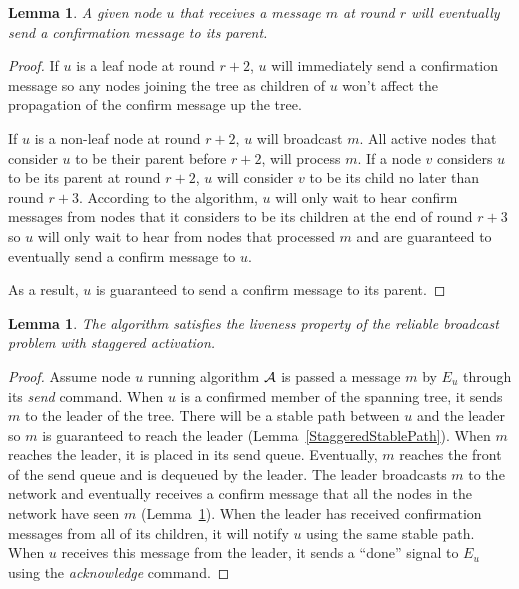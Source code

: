\documentclass[english]{article}
\newtheorem{lemma}[theorem]{Lemma}
\begin{document}
\begin{lemma}
\label{StaggeredSpanningTreePropagation}
A given node $u$ that receives a message $m$ at round $r$ will eventually send a confirmation message to its parent. 
\end{lemma}
\begin{proof}

 If $u$ is a leaf node at round $r+2$, $u$ will immediately send a confirmation message so any nodes joining the tree as children of $u$ won't affect the propagation of the confirm message up the tree. 

If $u$ is a non-leaf node at round $r+2$, $u$ will broadcast $m$. All active nodes that consider $u$ to be their parent before $r+2$, will process $m$. If a node $v$ considers $u$ to be its parent at round $r+2$, $u$ will consider $v$ to be its child no later than round $r+3$. According to the algorithm, $u$ will only wait to hear confirm messages from nodes that it considers to be its children at the end of round $r+3$ so $u$ will only wait to hear from nodes that processed $m$ and are guaranteed to eventually send a confirm message to $u$. 

As a result, $u$ is guaranteed to send a confirm message to its parent. 

\end{proof}

\begin{lemma}
\label{StaggeredRBLiveness}
The algorithm satisfies the liveness property of the reliable broadcast problem with staggered activation.
\end{lemma}
\begin{proof}

Assume node $u$ running algorithm $\cal A$ is passed a message $m$ by $E_u$ through its \textit{send} command. When $u$ is a confirmed member of the spanning tree, it sends $m$ to the leader of the tree. There will be a stable path between $u$ and the leader so $m$ is guaranteed to reach the leader (Lemma~\ref{StaggeredStablePath}). When $m$ reaches the leader, it is placed in its send queue. Eventually, $m$ reaches the front of the send queue and is dequeued by the leader. The leader broadcasts $m$ to the network and eventually receives a confirm message that all the nodes in the network have seen $m$ (Lemma~\ref{StaggeredSpanningTreePropagation}). When the leader has received confirmation messages from all of its children, it will notify $u$ using the same stable path. When $u$ receives this message from the leader, it sends  a ``done'' signal to $E_u$ using the \textit{acknowledge} command.

\end{proof}
\end{document}
